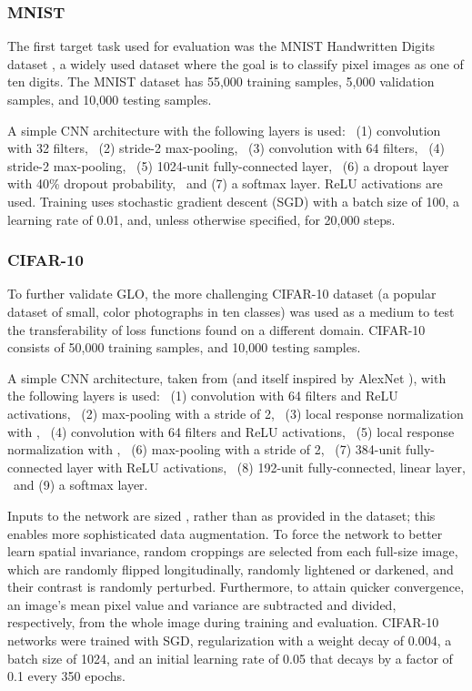 \documentclass[conference]{IEEEtran}
\newcommand{\TECH}{GLO\xspace}
\begin{document}
\subsubsection{MNIST}

The first target task used for evaluation was the MNIST Handwritten Digits dataset \cite{mnist}, a widely used dataset where the goal is to classify  pixel images as one of ten digits. The MNIST dataset has 55,000 training samples, 5,000 validation samples, and 10,000 testing samples.

A simple CNN architecture with the following layers is used: \
(1)  convolution with 32 filters, \
(2)  stride-2 max-pooling, \
(3)  convolution with 64 filters, \
(4)  stride-2 max-pooling, \
(5) 1024-unit fully-connected layer, \
(6) a dropout layer \cite{hinton2012improving} with 40\% dropout probability, \
and (7) a softmax layer. ReLU \cite{nair2010rectified} activations are used. Training uses stochastic gradient descent (SGD) with a batch size of 100, a learning rate of 0.01, and, unless otherwise specified, for 20,000 steps.


\subsubsection{CIFAR-10}

To further validate \TECH, the more challenging CIFAR-10 dataset \cite{krizhevsky2009learning} (a popular dataset of small, color photographs in ten classes) was used as a medium to test the transferability of loss functions found on a different domain. CIFAR-10 consists of 50,000 training samples, and 10,000 testing samples.

A simple CNN architecture, taken from \cite{gonzalez2019faster} (and itself inspired by AlexNet \cite{NIPS2012_4824}), with the following layers is used: \
(1)  convolution with 64 filters and ReLU activations, \
(2)  max-pooling with a stride of 2, \
(3) local response normalization \cite{NIPS2012_4824} with , \
(4)  convolution with 64 filters and ReLU activations, \ 
(5) local response normalization with , \
(6)  max-pooling with a stride of 2, \
(7) 384-unit fully-connected layer with ReLU activations, \
(8) 192-unit fully-connected, linear layer, \
and (9) a softmax layer.

Inputs to the network are sized , rather than  as provided in the dataset; this enables more sophisticated data augmentation. To force the network to better learn spatial invariance, random  croppings are selected from each full-size image, which are randomly flipped longitudinally, randomly lightened or darkened, and their contrast is randomly perturbed. Furthermore, to attain quicker convergence, an image's mean pixel value and variance are subtracted and divided, respectively, from the whole image during training and evaluation. CIFAR-10 networks were trained with SGD,  regularization with a weight decay of 0.004, a batch size of 1024, and an initial learning rate of 0.05 that decays by a factor of 0.1 every 350 epochs.
\end{document}
